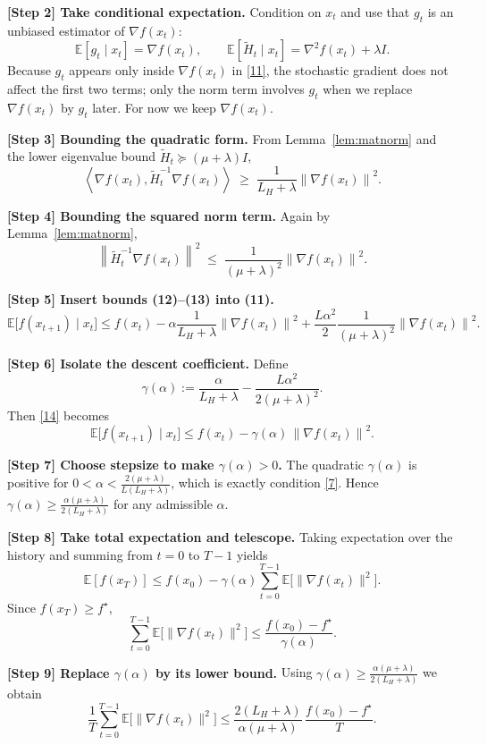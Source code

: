 \documentclass{article}
\newcommand{\EE}{\mathbb{E}}
\newcommand{\norm}[1]{\left\|#1\right\|}
\newcommand{\ip}[2]{\left\langle #1,#2\right\rangle}
\begin{document}
\noindent\textbf{[Step 2] Take conditional expectation.}
Condition on $x_t$ and use that $g_t$ is an unbiased estimator of $\nabla f(x_t)$:
\[
\EE[g_t\mid x_t]=\nabla f(x_t),\qquad
\EE[\tilde H_t\mid x_t]=\nabla^{2}f(x_t)+\lambda I .
\]
Because $g_t$ appears only inside $\nabla f(x_t)$ in \eqref{11}, the stochastic gradient
does not affect the first two terms; only the norm term involves $g_t$ when we replace
$\nabla f(x_t)$ by $g_t$ later.  For now we keep $\nabla f(x_t)$.

\noindent\textbf{[Step 3] Bounding the quadratic form.}
From Lemma~\ref{lem:matnorm} and the lower eigenvalue bound $\tilde H_t\succeq(\mu+\lambda)I$,
\[
\ip{\nabla f(x_t)}{\tilde H_t^{-1}\nabla f(x_t)}
\;\ge\;\frac{1}{L_H+\lambda}\norm{\nabla f(x_t)}^{2}.
\tag{12}
\]

\noindent\textbf{[Step 4] Bounding the squared norm term.}
Again by Lemma~\ref{lem:matnorm},
\[
\norm{\tilde H_t^{-1}\nabla f(x_t)}^{2}
\;\le\;\frac{1}{(\mu+\lambda)^{2}}\norm{\nabla f(x_t)}^{2}.
\tag{13}
\]

\noindent\textbf{[Step 5] Insert bounds (12)–(13) into (11).}
\[
\EE\!\bigl[f(x_{t+1})\mid x_t\bigr]
\le f(x_t)-\alpha\frac{1}{L_H+\lambda}\norm{\nabla f(x_t)}^{2}
     +\frac{L\alpha^{2}}{2}\frac{1}{(\mu+\lambda)^{2}}\norm{\nabla f(x_t)}^{2}.
\tag{14}
\]

\noindent\textbf{[Step 6] Isolate the descent coefficient.}
Define
\[
\gamma(\alpha):=
\frac{\alpha}{L_H+\lambda}
-\frac{L\alpha^{2}}{2(\mu+\lambda)^{2}} .
\tag{15}
\]
Then \eqref{14} becomes
\[
\EE\!\bigl[f(x_{t+1})\mid x_t\bigr]
\le f(x_t)-\gamma(\alpha)\,\norm{\nabla f(x_t)}^{2}.
\tag{16}
\]

\noindent\textbf{[Step 7] Choose stepsize to make $\gamma(\alpha)>0$.}
The quadratic $\gamma(\alpha)$ is positive for $0<\alpha<\frac{2(\mu+\lambda)}{L(L_H+\lambda)}$,
which is exactly condition \eqref{7}.  Hence $\gamma(\alpha)\ge
\frac{\alpha(\mu+\lambda)}{2(L_H+\lambda)}$ for any admissible $\alpha$.

\noindent\textbf{[Step 8] Take total expectation and telescope.}
Taking expectation over the history and summing from $t=0$ to $T-1$ yields
\[
\EE[f(x_T)]\le f(x_0)-\gamma(\alpha)\sum_{t=0}^{T-1}\EE\!\bigl[\|\nabla f(x_t)\|^{2}\bigr].
\tag{17}
\]
Since $f(x_T)\ge f^{\star}$,
\[
\sum_{t=0}^{T-1}\EE\!\bigl[\|\nabla f(x_t)\|^{2}\bigr]
\le\frac{f(x_0)-f^{\star}}{\gamma(\alpha)} .
\tag{18}
\]

\noindent\textbf{[Step 9] Replace $\gamma(\alpha)$ by its lower bound.}
Using $\gamma(\alpha)\ge \frac{\alpha(\mu+\lambda)}{2(L_H+\lambda)}$ we obtain
\[
\frac{1}{T}\sum_{t=0}^{T-1}\EE\!\bigl[\|\nabla f(x_t)\|^{2}\bigr]
\le
\frac{2(L_H+\lambda)}{\alpha(\mu+\lambda)}\,
\frac{f(x_0)-f^{\star}}{T}.
\tag{19}
\]
\end{document}
